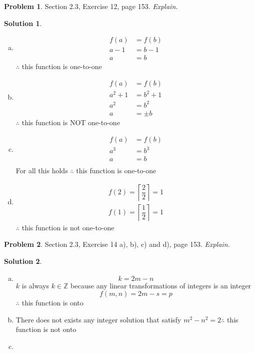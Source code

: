 \documentclass{article}
\theoremstyle{definition}
\newtheorem{problem}{Problem}
\newtheorem*{solution}{Solution}
\begin{document}
\begin{problem} Section 2.3, Exercise 12, page 153. \textsl{Explain.} 
\end{problem}
\begin{solution}
\begin{enumerate}[a)]
  \item 
  \begin{align*}
    f(a) &= f(b) \\
    a-1 &= b-1 \\
    a &= b
  \end{align*}
  $\therefore$ this function is one-to-one
  
  \item
  \begin{align*}
    f(a) &= f(b) \\
    a^2 + 1 &= b^2 + 1 \\
    a^2 &= b^2 \\
    a &= \pm b
  \end{align*}
  $\therefore$ this function is NOT one-to-one
  \item
  \begin{align*}
    f(a) &= f(b) \\
    a^3 &= b^3 \\
    a &= b \\
  \end{align*}
  For all this holds $\therefore$ this function is one-to-one
  \item
  \begin{align*}
    f(2) = \left \lceil \dfrac{2}{2} \right\rceil = 1 \\
    f(1) = \left \lceil \dfrac{1}{2} \right\rceil = 1
  \end{align*}
  $\therefore$ this function is not one-to-one
\end{enumerate}
\end{solution}

\begin{problem} Section 2.3, Exercise 14 a), b), c) and d), page 153. \textsl{Explain.}
\end{problem}
\begin{solution}\ \\
\begin{enumerate}[a)]
  \item
  \begin{equation}
    k = 2m - n
  \end{equation}
  $k$ is always $k \in \mathbb{Z}$ because any linear transformations of integers is an integer
  \begin{equation}
    f(m,n) = 2m - s = p
  \end{equation}
  $\therefore$ this function is onto
  
  \item
  There does not exists any integer solution that satisfy $m^2 - n^2 = 2 \therefore$ this function is not onto
  \item
  
\end{enumerate}
\end{solution}
\end{document}
